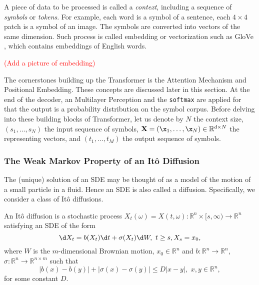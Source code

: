A piece of data to be processed is called a \textit{context}, including a sequence of \textit{symbols} or \textit{tokens}. For example, each word is a symbol of a sentence, each $4\times 4$ patch is a symbol of an image. The symbols are converted into vectors of the same dimension. Such process is called embedding or vectorization such as GloVe \cite{pennington2014glove}, which contains embeddings of English words.

\textcolor{red}{(Add a picture of embedding)}

The cornerstones building up the Transformer is the Attention Mechanism and Positional Embedding. These concepts are discussed later in this section. At the end of the decoder, an Multilayer Perception and the \texttt{softmax} are applied for that the output is a probability distribution on the symbol corpus. Before delving into these building blocks of Transformer, let us denote by $N$ the context size, $(s_1,\ldots,s_N)$ the input sequence of symbols, $\mathbf{X}=(\x_1,\ldots,\x_N)\in\mathbb{R}^{d\times N}$ the representing vectors, and $(t_1,\ldots,t_M)$ the output sequence of symbols.


\subsubsection{The Weak Markov Property of an Itô Diffusion}
The (unique) solution of an SDE may be thought of as a model of the motion of a small particle in a fluid. Hence an SDE is also called a diffusion. Specifically, we consider a class of Itô diffusions.

\begin{definition}
    An Itô diffusion is a stochastic process $X_t(\omega)=X(t,\omega):\mathbb{R}^n\times[s,\infty)\to\mathbb{R}^n$ satisfying an SDE of the form
    \begin{equation}
        \label{equation:itodiff}
        \d X_t = b(X_t)\d t+\sigma(X_t)\d W,\,\, t\ge s, X_s = x_0,
    \end{equation}
    where $W$ is the $m$-dimensional Brownian motion, $x_0\in\mathbb{R}^n$ and $b:\mathbb{R}^n\to\mathbb{R}^n$, $\sigma:\mathbb{R}^n\to\mathbb{R}^{n\times m}$ such that
    \begin{equation}
        \label{equation:lip}
        |b(x)-b(y)|+|\sigma(x)-\sigma(y)|\le D|x-y|,\,\,x,y\in\mathbb{R}^n,
    \end{equation}
    for some constant $D$.
\end{definition}

